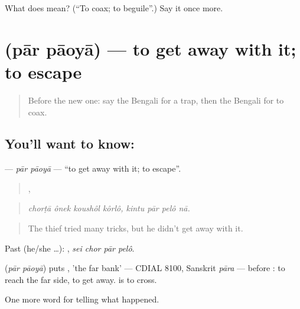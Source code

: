 \begin{tcolorbox}[breakable,colback=teal!4,colframe=teal!35!black,title={Before you move on}]
What does  mean? (\textquotedblleft{}To coax; to beguile\textquotedblright{}.) Say it once more.
\end{tcolorbox}
\section[\texorpdfstring{\bn{পার} \bn{পাওয়া} (pār pāoyā)}{পার পাওয়া (pār pāoyā)}]{  (pār pāoyā) — to get away with it; to escape}

\label{lesson:BN-C324-par-paoya}



\begin{quote}
Before the new one: say the Bengali for a trap, then the Bengali for to coax.
\end{quote}

\subsection*{You'll want to know:  }
\textbf{ } — \emph{pār pāoyā} — \textquotedblleft{}to get away with it; to escape\textquotedblright{}.

\begin{quote}
   ,    
\end{quote}

\begin{quote}
\emph{chorṭā ônek koushôl kôrlô, kintu pār pelô nā.}
\end{quote}

\begin{quote}
The thief tried many tricks, but he didn't get away with it.
\end{quote}

Past (he/she …):    , \emph{sei chor pār pelô}.

\begin{cousinweb}
\textbf{ } (\emph{pār pāoyā}) puts , 'the far bank' — CDIAL 8100, Sanskrit \emph{pāra} — before \textbf{}: to reach the far side, to get away. \textbf{ } is to cross.
\end{cousinweb}

\begin{grammarlens}[title={What you've built}]
One more word for telling what happened.
\end{grammarlens}

